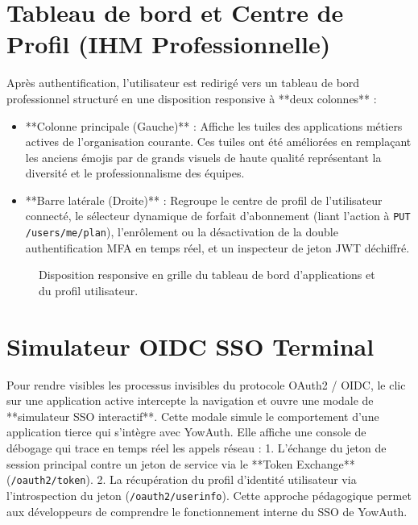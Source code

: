 \documentclass[11pt,a4paper,oneside]{report}
\newcommand{\code}[1]{\texttt{\small #1}}
\begin{document}
\section{Tableau de bord et Centre de Profil (IHM Professionnelle)}
Après authentification, l'utilisateur est redirigé vers un tableau de bord professionnel structuré en une disposition responsive à **deux colonnes** :
\begin{itemize}
  \item **Colonne principale (Gauche)** : Affiche les tuiles des applications métiers actives de l'organisation courante. Ces tuiles ont été améliorées en remplaçant les anciens émojis par de grands visuels de haute qualité représentant la diversité et le professionnalisme des équipes.
  \item **Barre latérale (Droite)** : Regroupe le centre de profil de l'utilisateur connecté, le sélecteur dynamique de forfait d'abonnement (liant l'action à \code{PUT /users/me/plan}), l'enrôlement ou la désactivation de la double authentification MFA en temps réel, et un inspecteur de jeton JWT déchiffré.
\end{itemize}

\begin{figure}[h]
  \centering
  \caption{Disposition responsive en grille du tableau de bord d'applications et du profil utilisateur.}
  \label{fig:poc-dashboard}
\end{figure}

\section{Simulateur OIDC SSO Terminal}
Pour rendre visibles les processus invisibles du protocole OAuth2 / OIDC, le clic sur une application active intercepte la navigation et ouvre une modale de **simulateur SSO interactif**.
Cette modale simule le comportement d'une application tierce qui s'intègre avec YowAuth. Elle affiche une console de débogage qui trace en temps réel les appels réseau :
1. L'échange du jeton de session principal contre un jeton de service via le **Token Exchange** (\code{/oauth2/token}).
2. La récupération du profil d'identité utilisateur via l'introspection du jeton (\code{/oauth2/userinfo}).
Cette approche pédagogique permet aux développeurs de comprendre le fonctionnement interne du SSO de YowAuth.
\end{document}
